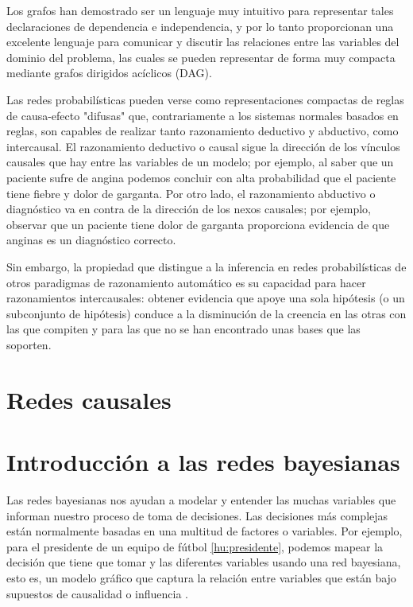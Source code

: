 Los grafos han demostrado ser un lenguaje muy intuitivo para representar
tales declaraciones de dependencia e independencia, y por lo tanto proporcionan una excelente
lenguaje para comunicar y discutir las relaciones entre las 
variables del dominio del problema, las cuales se pueden representar de forma muy compacta 
mediante grafos dirigidos acíclicos (DAG).

Las redes probabilísticas pueden verse como representaciones compactas de reglas de causa-efecto "difusas" 
que, contrariamente a los sistemas normales basados en reglas, son capables de realizar tanto razonamiento 
deductivo y abductivo, como intercausal. El razonamiento deductivo o causal
sigue la dirección de los vínculos causales que hay entre las variables de un modelo; por ejemplo, al saber
que un paciente sufre de angina podemos concluir con alta probabilidad que
el paciente tiene fiebre y dolor de garganta. Por otro lado, el razonamiento abductivo o diagnóstico 
va en contra de la dirección de los nexos causales; por ejemplo, observar
que un paciente tiene dolor de garganta proporciona evidencia de que anginas es un diagnóstico correcto.

Sin embargo, la propiedad que distingue a la inferencia en redes probabilísticas
de otros paradigmas de razonamiento automático es su capacidad para hacer razonamientos intercausales: 
obtener evidencia que apoye una sola hipótesis (o un subconjunto de
hipótesis) conduce a la disminución de la creencia en las otras con las que compiten y para las que no se 
han encontrado unas bases que las soporten. 

\section{Redes causales}

\section{Introducción a las redes bayesianas}
Las redes bayesianas nos ayudan a modelar y entender las muchas variables que informan nuestro proceso de 
toma de decisiones. Las decisiones más complejas están normalmente basadas en una multitud de factores o 
variables. Por ejemplo, para el presidente de un equipo de fútbol \ref{hu:presidente}, podemos 
mapear la decisión que tiene que tomar y las diferentes variables usando 
una red bayesiana, esto es, un modelo gráfico que captura la relación entre variables que están bajo 
supuestos de causalidad o influencia \cite{things-to-know-BN}.


